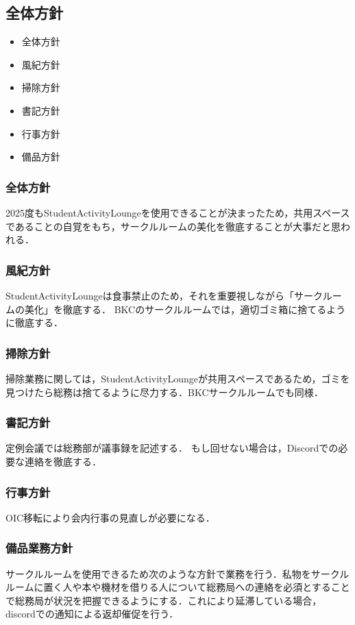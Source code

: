 \subsection*{全体方針}


\begin{itemize}
	\item 全体方針
	\item 風紀方針
	\item 掃除方針
	\item 書記方針
	\item 行事方針
	\item 備品方針
\end{itemize}

\subsubsection*{全体方針}
2025度もStudentActivityLoungeを使用できることが決まったため，共用スペースであることの自覚をもち，サークルルームの美化を徹底することが大事だと思われる．

\subsubsection*{風紀方針}
StudentActivityLoungeは食事禁止のため，それを重要視しながら「サークルームの美化」を徹底する．
BKCのサークルルームでは，適切ゴミ箱に捨てるように徹底する．

\subsubsection*{掃除方針}
掃除業務に関しては，StudentActivityLoungeが共用スペースであるため，ゴミを見つけたら総務は捨てるように尽力する．BKCサークルルームでも同様．

\subsubsection*{書記方針}
定例会議では総務部が議事録を記述する．
もし回せない場合は，Discordでの必要な連絡を徹底する．

\subsubsection*{行事方針}
OIC移転により会内行事の見直しが必要になる．

\subsubsection*{備品業務方針}
サークルルームを使用できるため次のような方針で業務を行う．私物をサークルルームに置く人や本や機材を借りる人について総務局への連絡を必須とすることで総務局が状況を把握できるようにする．これにより延滞している場合，discordでの通知による返却催促を行う．
